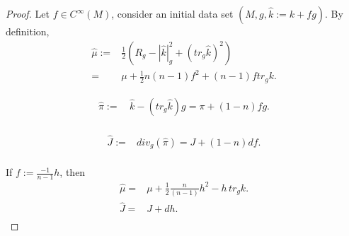 \documentclass[11pt]{amsart}
\theoremstyle{remark}
\numberwithin{equation}{section}
\def\lf{\left}
\def\ri{\right}
\def\la{\langle}
\def\ra{\rangle}
\def\Na{\nabla}
\def\h {\hat}
\begin{document}
{{\begin{proof}
Let $f\in C^\infty(M)$, consider an initial data set $(M,g,\hat k:=k+fg)$. 
By definition, 
\begin{equation}
\begin{split}
\hat \mu :=& \frac{1}{2}\lf( R_g-|\h k|_g^2+(tr_g \hat k)^2 \ri)\\
=&\mu+\frac{1}{2}n(n-1)f^2+(n-1)ftr_gk.  
\end{split}
\end{equation}

\begin{equation}
\begin{split}
\hat \pi:=&\, \h k-(tr_g \h k)g=\pi+(1-n)fg.\\
\end{split}
\end{equation}

\begin{equation}
\begin{split}
\hat J:=& div_{g}(\hat \pi)= J + (1-n) df. \\
\end{split}
\end{equation}



If $f:=\frac{-1}{n-1}h$, then 
\begin{equation}
\begin{split}
\hat \mu 
=&\mu+\frac{1}{2}\frac{n}{(n-1)}h^2-h\, tr_gk.  \\
\hat J= & J+dh. \\
\end{split} 
\end{equation}

\end{proof}

}}
\end{document}
